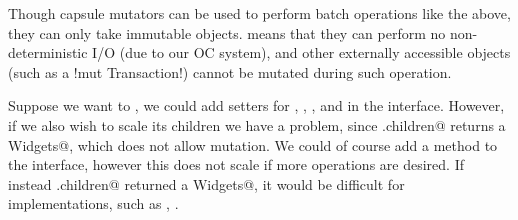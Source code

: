 \noindent Though capsule mutators can be used to perform batch operations like the above, they can only take immutable  objects.  means that they can perform no non-deterministic I/O (due to our OC system), and other externally accessible objects (such as a \Q!mut Transaction!) cannot be mutated during such   operation.

Suppose we want to   \Q@Widget@{}, we could add \Q@mut@ setters for \Q@width@, \Q@height@, \Q@left@, and \Q@top@ in the \Q@Widget@ interface. However, if we also wish to scale its children we have a problem, since \Q@Widget.children@ returns a \Q@read Widgets@, which does not allow mutation. We could of course add a \Q@mut@ method \Q@zoom@ to the \Q@Widget@ interface, however this does not scale if more operations are desired. If instead \Q@Widget.children@ returned a \Q@mut Widgets@, it would be difficult for \Q@Widget@ implementations, such as \Q@SafeMovable@, 
 .


